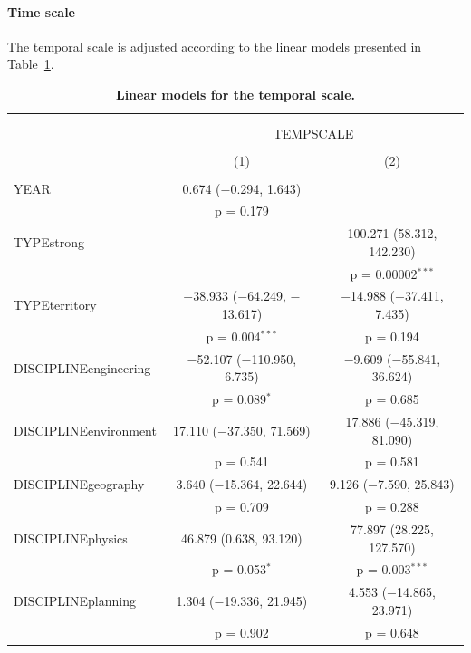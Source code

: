 \documentclass[10pt]{article}
\begin{document}
\paragraph{Time scale}

The temporal scale is adjusted according to the linear models presented in Table~\ref{tab:app:modelography:tempscale}.


\begin{table}%
\centering 
    \caption{\textbf{Linear models for the temporal scale.}\label{tab:app:modelography:tempscale}}
\begin{tabular}{@{\extracolsep{5pt}}lcc} 
\\[-1.8ex]\hline 
\hline \\[-1.8ex] 
\\[-1.8ex] & \multicolumn{2}{c}{TEMPSCALE} \\ 
\\[-1.8ex] & (1) & (2)\\ 
\hline \\[-1.8ex] 
 YEAR & 0.674 ($-$0.294, 1.643) &  \\ 
  & p = 0.179 &  \\ 
  TYPEstrong &  & 100.271 (58.312, 142.230) \\ 
  &  & p = 0.00002$^{***}$ \\ 
  TYPEterritory & $-$38.933 ($-$64.249, $-$13.617) & $-$14.988 ($-$37.411, 7.435) \\ 
  & p = 0.004$^{***}$ & p = 0.194 \\ 
  DISCIPLINEengineering & $-$52.107 ($-$110.950, 6.735) & $-$9.609 ($-$55.841, 36.624) \\ 
  & p = 0.089$^{*}$ & p = 0.685 \\ 
  DISCIPLINEenvironment & 17.110 ($-$37.350, 71.569) & 17.886 ($-$45.319, 81.090) \\ 
  & p = 0.541 & p = 0.581 \\ 
  DISCIPLINEgeography & 3.640 ($-$15.364, 22.644) & 9.126 ($-$7.590, 25.843) \\ 
  & p = 0.709 & p = 0.288 \\ 
  DISCIPLINEphysics & 46.879 (0.638, 93.120) & 77.897 (28.225, 127.570) \\ 
  & p = 0.053$^{*}$ & p = 0.003$^{***}$ \\ 
  DISCIPLINEplanning & 1.304 ($-$19.336, 21.945) & 4.553 ($-$14.865, 23.971) \\ 
  & p = 0.902 & p = 0.648 \\ 

\end{tabular}
\end{table}
\end{document}
